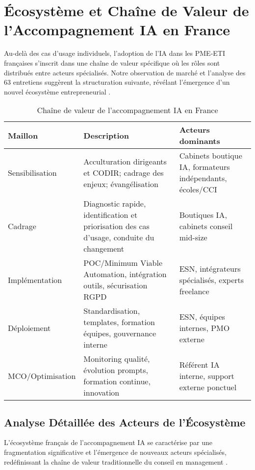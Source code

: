 \section{Écosystème et Chaîne de Valeur de l'Accompagnement IA en France}
\label{sec:value_chain}

Au-delà des cas d'usage individuels, l'adoption de l'IA dans les PME-ETI françaises s'inscrit dans une chaîne de valeur spécifique où les rôles sont distribués entre acteurs spécialisés. Notre observation de marché et l'analyse des 63 entretiens suggèrent la structuration suivante, révélant l'émergence d'un nouvel écosystème entrepreneurial \cite{moore1996death}.

\begin{table}[ht]
\centering
\caption{Chaîne de valeur de l'accompagnement IA en France}
\label{tab:value_chain}
\begin{tabular}{@{}p{3.5cm}p{6.5cm}p{5cm}@{}}
\toprule
\textbf{Maillon} & \textbf{Description} & \textbf{Acteurs dominants} \\
\midrule
Sensibilisation & Acculturation dirigeants et CODIR; cadrage des enjeux; évangélisation & Cabinets boutique IA, formateurs indépendants, écoles/CCI \\
Cadrage & Diagnostic rapide, identification et priorisation des cas d'usage, conduite du changement & Boutiques IA, cabinets conseil mid-size \\
Implémentation & POC/Minimum Viable Automation, intégration outils, sécurisation RGPD & ESN, intégrateurs spécialisés, experts freelance \\
Déploiement & Standardisation, templates, formation équipes, gouvernance interne & ESN, équipes internes, PMO externe \\
MCO/Optimisation & Monitoring qualité, évolution prompts, formation continue, innovation & Référent IA interne, support externe ponctuel \\
\bottomrule
\end{tabular}
\end{table}

\subsection{Analyse Détaillée des Acteurs de l'Écosystème}

L'écosystème français de l'accompagnement IA se caractérise par une fragmentation significative et l'émergence de nouveaux acteurs spécialisés, redéfinissant la chaîne de valeur traditionnelle du conseil en management \cite{syntec2024ai}.

